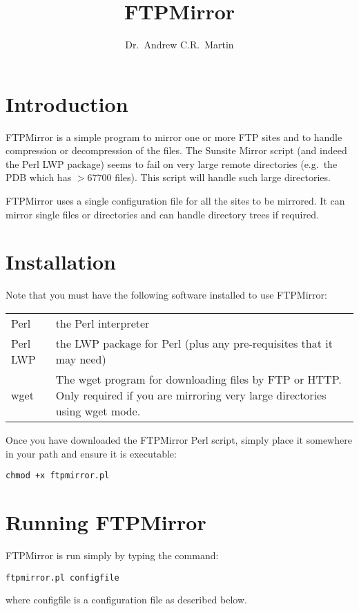 \documentclass{article}
\title{FTPMirror}
\author{Dr.\ Andrew C.R.\ Martin}
\begin{document}
\maketitle

\section{Introduction}
FTPMirror is a simple program to mirror one or more FTP sites and to
handle compression or decompression of the files. The Sunsite Mirror
script (and indeed the Perl LWP package) seems to fail on very large
remote directories (e.g.\ the PDB which has $>67700$ files). This script
will handle such large directories.

FTPMirror uses a single configuration file for all the sites to be
mirrored. It can mirror single files or directories and can handle
directory trees if required.

\section{Installation}
Note that you must have the following software installed to use
FTPMirror:

\begin{center}
\begin{tabularx}{\linewidth}{lX}\hline
Perl & the Perl interpreter \\
Perl LWP &  the LWP package for Perl (plus any pre-requisites
that it may need) \\
wget &  The wget program for downloading files by FTP or
HTTP. Only required if you are mirroring very large directories
using wget mode.\\\hline
\end{tabularx}
\end{center}

Once you have downloaded the FTPMirror Perl script, simply place it
somewhere in your path and ensure it is executable:
\begin{verbatim}
chmod +x ftpmirror.pl
\end{verbatim}

\section{Running FTPMirror}
FTPMirror is run simply by typing the command:
\begin{verbatim}
ftpmirror.pl configfile
\end{verbatim}
where configfile is a configuration file as described below.
\vspace{2em}
\end{document}
